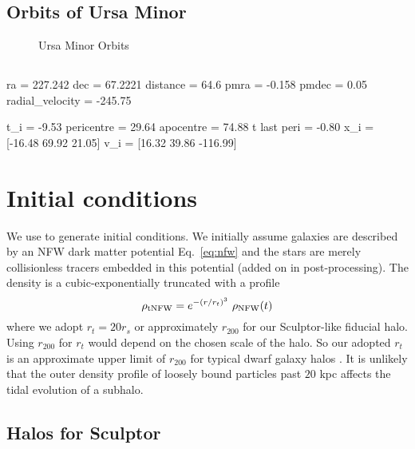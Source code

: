 \subsection{Orbits of Ursa Minor}\label{orbits-of-ursa-minor}

\begin{figure}
\centering
{}
\caption{Ursa Minor Orbits}
\end{figure}

\subsection{}\label{section}

ra = 227.242 dec = 67.2221 distance = 64.6 pmra = -0.158 pmdec = 0.05
radial\_velocity = -245.75

t\_i = -9.53 pericentre = 29.64 apocentre = 74.88 t last peri = -0.80
x\_i = {[}-16.48 69.92 21.05{]} v\_i = {[}16.32 39.86 -116.99{]}

\section{Initial conditions}\label{initial-conditions}

We use \agama [@agama] to generate initial conditions. We initially
assume galaxies are described by an NFW dark matter potential
Eq.~\ref{eq:nfw} and the stars are merely collisionless tracers embedded
in this potential (added on in post-processing). The density is a
cubic-exponentially truncated with a profile \begin{equation}{
\rho_{\rm tNFW} = e^{-(r/r_t)^3}\ \rho_{\rm NFW}(t)
}\end{equation} where we adopt \(r_t = 20 r_s\) or approximately
\(r_{200}\) for our Sculptor-like fiducial halo. Using \(r_{200}\) for
\(r_t\) would depend on the chosen scale of the halo. So our adopted
\(r_t\) is an approximate upper limit of \(r_{200}\) for typical dwarf
galaxy halos \citep{ludlow+2016}. It is unlikely that the outer density
profile of loosely bound particles past \(20\) kpc affects the tidal
evolution of a subhalo.

\subsection{Halos for Sculptor}\label{halos-for-sculptor}

